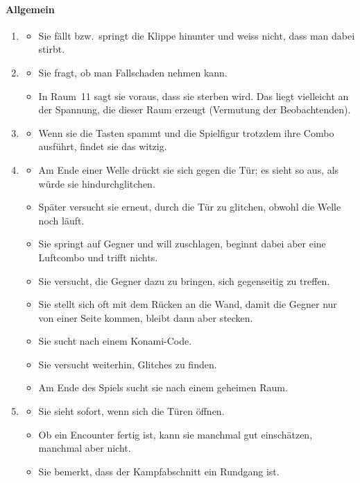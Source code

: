 \documentclass[../Main.tex]{subfiles}
\begin{document}
\paragraph{Allgemein}
\begin{enumerate}[label=\textbf{B\arabic*}, leftmargin=1.5cm, itemsep=0.8em, resume]
    \item
        \begin{itemize}[nosep]
            \item Sie fällt bzw.\ springt die Klippe hinunter und weiss nicht, dass man dabei stirbt.
        \end{itemize}
    \item
        \begin{itemize}[nosep]
            \item Sie fragt, ob man Fallschaden nehmen kann.
            \item In Raum~11 sagt sie voraus, dass sie sterben wird. Das liegt vielleicht an der Spannung, die dieser Raum erzeugt (Vermutung der Beobachtenden).
        \end{itemize}
    \item
        \begin{itemize}[nosep]
            \item Wenn sie die Tasten spammt und die Spielfigur trotzdem ihre Combo ausführt, findet sie das witzig.
        \end{itemize}
    \item
        \begin{itemize}[nosep]
            \item Am Ende einer Welle drückt sie sich gegen die Tür; es sieht so aus, als würde sie hindurchglitchen.
            \item Später versucht sie erneut, durch die Tür zu glitchen, obwohl die Welle noch läuft.
            \item Sie springt auf Gegner und will zuschlagen, beginnt dabei aber eine Luftcombo und trifft nichts.
            \item Sie versucht, die Gegner dazu zu bringen, sich gegenseitig zu treffen.
            \item Sie stellt sich oft mit dem Rücken an die Wand, damit die Gegner nur von einer Seite kommen, bleibt dann aber stecken.
            \item Sie sucht nach einem Konami-Code.
            \item Sie versucht weiterhin, Glitches zu finden.
            \item Am Ende des Spiels sucht sie nach einem geheimen Raum.
        \end{itemize}
    \item
        \begin{itemize}[nosep]
            \item Sie sieht sofort, wenn sich die Türen öffnen.
            \item Ob ein Encounter fertig ist, kann sie manchmal gut einschätzen, manchmal aber nicht.
            \item Sie bemerkt, dass der Kampfabschnitt ein Rundgang ist.
        \end{itemize}
\end{enumerate}
\end{document}

